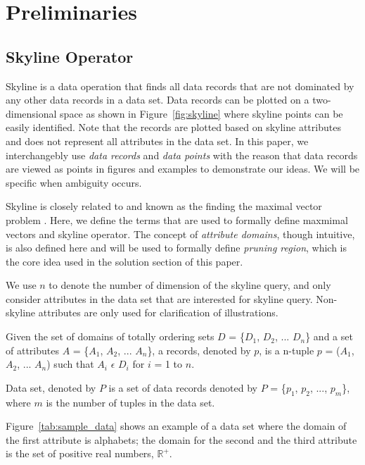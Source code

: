 \documentclass{sig-alternate}
\newenvironment{definition}[1][Definition]{\begin{trivlist}
\item[\hskip \labelsep {\bfseries #1}]}{\end{trivlist}}
\begin{document}
\section{Preliminaries}

\subsection{Skyline Operator}\label{sec:skyline_operator}
Skyline is a data operation that finds all data records that are not
dominated by any other data records in a data set. Data records can be
plotted on a two-dimensional space as shown in Figure~\ref{fig:skyline}
where skyline points can be easily identified. Note that the records
are plotted based on skyline attributes and does not represent all
attributes in the data set. In this paper, we interchangebly use
\emph{data records} and \emph{data points} with the reason that data
records are viewed as points in figures and examples to demonstrate our
ideas. We will be specific when ambiguity occurs.

Skyline is closely related to and known as the finding the maximal vector
problem \cite{Kung75onfinding}. Here, we define the terms that are used
to formally define maxmimal
vectors and skyline operator. The concept of \emph{attribute domains},
though intuitive, is also defined here and will be used to formally define
\emph{pruning region}, which is the core idea used in the solution
section of this paper.

We use $n$ to denote the number of dimension of the skyline query, and
only consider attributes in the data set that are interested for skyline
query. Non-skyline attributes are only used for clarification of
illustrations.

\begin{definition}[Record] Given the set of domains of totally ordering sets
$D$ = \{$D_1$, $D_2$, ... $D_n$\} and a set of attributes
$A$ = \{$A_1$, $A_2$, ... $A_n$\}, a records, denoted by $p$, is a
n-tuple $p$ = ($A_1$, $A_2$, ... $A_n$) such that $A_i$ $\epsilon$
$D_i$ for $i$ = 1 to $n$.
\end{definition}

\begin{definition}[Data Set]
Data set, denoted by $P$ is a set of data records denoted by
$P$ = \{$p_1$, $p_2$, ..., $p_m$\}, where $m$ is the number of tuples
in the data set.
\end{definition}

Figure~\ref{tab:sample_data} shows an example of a data set where the
domain of the first attribute is alphabets; the domain for the second
and the third attribute is the set of positive real numbers, $\mathbb{R}^+$.
\end{document}
